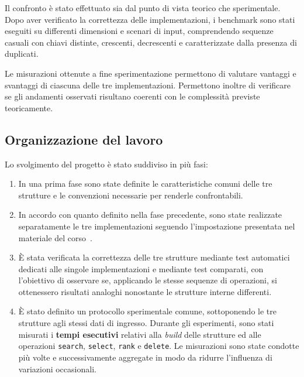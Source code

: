 \documentclass[a4paper,11pt]{article}
\begin{document}
Il confronto è stato effettuato sia dal punto di vista teorico che sperimentale. Dopo aver verificato la correttezza delle implementazioni, i benchmark sono stati eseguiti su differenti dimensioni e scenari di input, comprendendo sequenze casuali con chiavi distinte, crescenti, decrescenti e caratterizzate dalla presenza di duplicati. 

Le misurazioni ottenute a fine sperimentazione permettono di valutare vantaggi e svantaggi di ciascuna delle tre implementazioni. Permettono inoltre di verificare se gli andamenti osservati risultano coerenti con le complessità previste teoricamente. 


\subsection{Organizzazione del lavoro}
Lo svolgimento del progetto è stato suddiviso in più fasi:
\begin{enumerate}
    \item In una prima fase sono state definite le caratteristiche comuni delle tre strutture e le convenzioni necessarie per renderle confrontabili.
    
    \item In accordo con quanto definito nella fase precedente, sono state realizzate separatamente le tre implementazioni seguendo l'impostazione presentata nel materiale del corso~\cite{slide-asd-2025}.
    
    \item È stata verificata la correttezza delle tre strutture mediante test automatici dedicati alle singole implementazioni e mediante test comparati, con l'obiettivo di osservare se, applicando le stesse sequenze di operazioni, si ottenessero risultati analoghi nonostante le strutture interne differenti.
    
    \item È stato definito un protocollo sperimentale comune, sottoponendo le tre strutture agli stessi dati di ingresso. Durante gli esperimenti, sono stati misurati i \textbf{tempi esecutivi} relativi alla \textit{build} delle strutture ed alle operazioni \texttt{search}, \texttt{select}, \texttt{rank} e \texttt{delete}. Le misurazioni sono state condotte più volte e successivamente aggregate in modo da ridurre l'influenza di variazioni occasionali. 
\end{enumerate}
\end{document}
